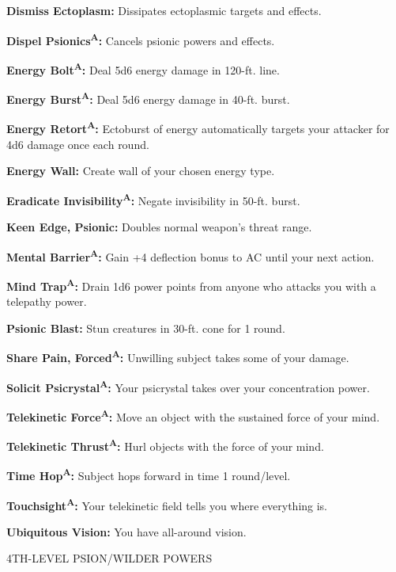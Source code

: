 \documentclass{article}
\begin{document}
\textbf{Dismiss Ectoplasm: }Dissipates ectoplasmic targets and effects.

\textbf{Dispel Psionics}\textsuperscript{\textbf{A}}\textbf{: }Cancels psionic 
powers and effects.

\textbf{Energy Bolt}\textsuperscript{\textbf{A}}\textbf{: }Deal 5d6 energy damage 
in 120-ft. line.

\textbf{Energy Burst}\textsuperscript{\textbf{A}}\textbf{: }Deal 5d6 energy damage 
in 40-ft. burst.

\textbf{Energy Retort}\textsuperscript{\textbf{A}}\textbf{: }Ectoburst of energy 
automatically targets your attacker for 4d6 damage once each round. 

\textbf{Energy Wall: }Create wall of your chosen energy type.

\textbf{Eradicate Invisibility}\textsuperscript{\textbf{A}}\textbf{: }Negate invisibility 
in 50-ft. burst.

\textbf{Keen Edge, Psionic: }Doubles normal weapon's threat range.

\textbf{Mental Barrier}\textsuperscript{\textbf{A}}\textbf{: }Gain +4 deflection 
bonus to AC until your next action.

\textbf{Mind Trap}\textsuperscript{\textbf{A}}\textbf{: }Drain 1d6 power points 
from anyone who attacks you with a telepathy power.

\textbf{Psionic Blast: }Stun creatures in 30-ft. cone for 1 round.

\textbf{Share Pain, Forced}\textsuperscript{\textbf{A}}\textbf{: }Unwilling subject 
takes some of your damage.

\textbf{Solicit Psicrystal}\textsuperscript{\textbf{A}}\textbf{: }Your psicrystal 
takes over your concentration power.

\textbf{Telekinetic Force}\textsuperscript{\textbf{A}}\textbf{: }Move an object 
with the sustained force of your mind.

\textbf{Telekinetic Thrust}\textsuperscript{\textbf{A}}\textbf{: }Hurl objects 
with the force of your mind.

\textbf{Time Hop}\textsuperscript{\textbf{A}}\textbf{: }Subject hops forward in 
time 1 round/level.

\textbf{Touchsight}\textsuperscript{\textbf{A}}\textbf{: }Your telekinetic field 
tells you where everything is.

\textbf{Ubiquitous Vision: }You have all-around vision.

4TH-LEVEL PSION/WILDER POWERS
\end{document}
